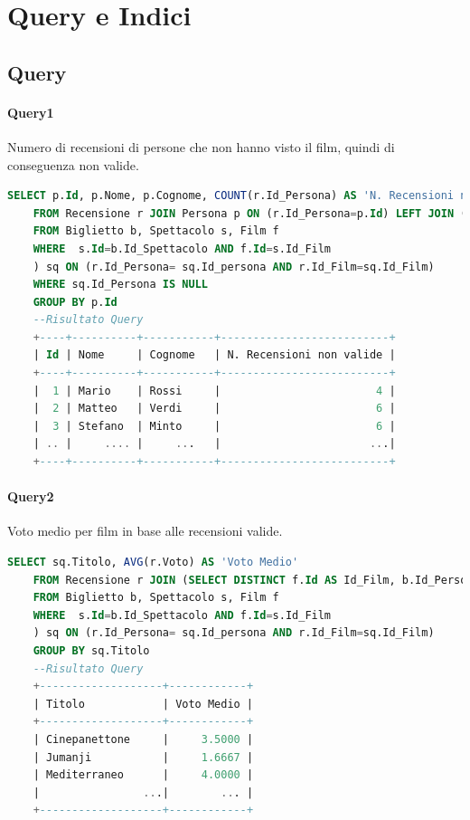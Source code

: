 \documentclass[10pt]{article}
\begin{document}
	\section{Query e Indici}
	\subsection{Query}
	\paragraph{Query1}
	Numero di recensioni di persone che non hanno visto il film, quindi di conseguenza non valide.		
	\begin{lstlisting}[language=SQL]
	SELECT p.Id, p.Nome, p.Cognome, COUNT(r.Id_Persona) AS 'N. Recensioni non valide'
	FROM Recensione r JOIN Persona p ON (r.Id_Persona=p.Id) LEFT JOIN (SELECT DISTINCT f.Id AS Id_Film, b.Id_Persona AS Id_Persona, f.Titolo as Titolo
	FROM Biglietto b, Spettacolo s, Film f
	WHERE  s.Id=b.Id_Spettacolo AND f.Id=s.Id_Film
	) sq ON (r.Id_Persona= sq.Id_persona AND r.Id_Film=sq.Id_Film)
	WHERE sq.Id_Persona IS NULL
	GROUP BY p.Id	
	--Risultato Query
	+----+----------+-----------+--------------------------+
	| Id | Nome     | Cognome   | N. Recensioni non valide |
	+----+----------+-----------+--------------------------+
	|  1 | Mario    | Rossi     |                        4 |
	|  2 | Matteo   | Verdi     |                        6 |
	|  3 | Stefano  | Minto     |                        6 |
	| .. |     .... |     ...   |                       ...|
	+----+----------+-----------+--------------------------+	
	\end{lstlisting}
	\paragraph{Query2}
	Voto medio per film in base alle recensioni valide.
	\begin{lstlisting}[language=SQL]
	SELECT sq.Titolo, AVG(r.Voto) AS 'Voto Medio'
	FROM Recensione r JOIN (SELECT DISTINCT f.Id AS Id_Film, b.Id_Persona AS Id_Persona, f.Titolo as Titolo
	FROM Biglietto b, Spettacolo s, Film f
	WHERE  s.Id=b.Id_Spettacolo AND f.Id=s.Id_Film
	) sq ON (r.Id_Persona= sq.Id_persona AND r.Id_Film=sq.Id_Film)
	GROUP BY sq.Titolo	
	--Risultato Query
	+-------------------+------------+
	| Titolo            | Voto Medio |
	+-------------------+------------+
	| Cinepanettone     |     3.5000 |
	| Jumanji           |     1.6667 |
	| Mediterraneo      |     4.0000 |
	|                ...|        ... |
	+-------------------+------------+	
	\end{lstlisting}
	\pagebreak
\end{document}

